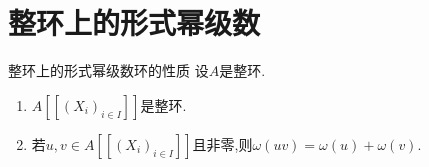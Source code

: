 \section{整环上的形式幂级数}

\begin{proposition}{整环上的形式幂级数环的性质}{}
	设$A$是整环.
	\begin{enumerate}
		\item $A[[(X_{i})_{i\in I}]]$是整环.
		\item 若$u,v\in A[[(X_{i})_{i\in I}]]$且非零,则$\omega\left(uv\right)=\omega\left(u\right)+\omega\left(v\right)$.
	\end{enumerate}
\end{proposition}